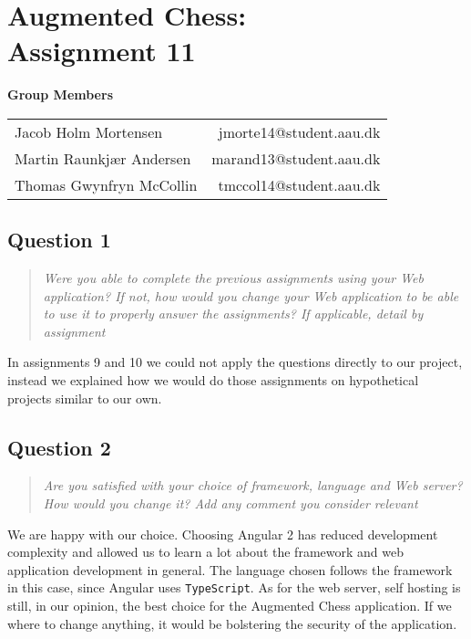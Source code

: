 \documentclass[10pt,a4paper]{report}
\begin{document}
\chapter{Augmented Chess:\\ Assignment 11}

\begin{center}
	{\Large \textbf{Group Members}}
	\begin{tabular}{l r}
		Jacob Holm Mortensen            &       jmorte14@student.aau.dk\\
		Martin Raunkjær Andersen        &       marand13@student.aau.dk\\
		Thomas Gwynfryn McCollin        &       tmccol14@student.aau.dk
	\end{tabular}
\end{center}

\section{Question 1}
\begin{quote}
\textit{Were you able to complete the previous assignments using your Web application? If not, how would you change your Web application to be able to use it to properly answer the assignments? If applicable, detail by assignment}
\end{quote}

In assignments 9 and 10 we could not apply the questions directly to our project, instead we explained how we would do those assignments on hypothetical projects similar to our own.

\section{Question 2}
\begin{quote}
\textit{Are you satisfied with your choice of framework, language and Web server? How would you change it? Add any comment you consider relevant}
\end{quote}

We are happy with our choice. Choosing Angular 2 has reduced development complexity and allowed us to learn a lot about the framework and web application development in general. The language chosen follows the framework in this case, since Angular uses \texttt{TypeScript}. As for the web server, self hosting is still, in our opinion, the best choice for the Augmented Chess application. If we where to change anything, it would be bolstering the security of the application.
\end{document}
